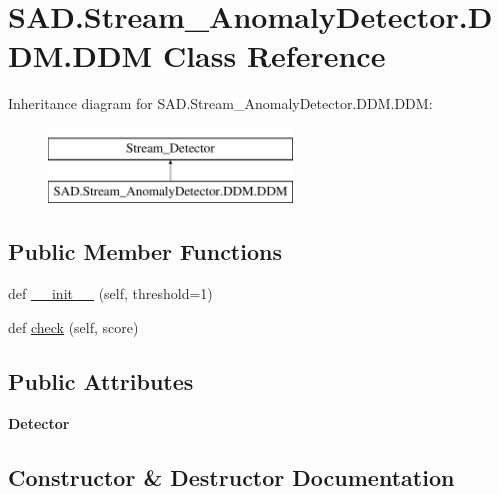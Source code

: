 \hypertarget{classSAD_1_1Stream__AnomalyDetector_1_1DDM_1_1DDM}{}\section{S\+A\+D.\+Stream\+\_\+\+Anomaly\+Detector.\+D\+D\+M.\+D\+DM Class Reference}
\label{classSAD_1_1Stream__AnomalyDetector_1_1DDM_1_1DDM}
Inheritance diagram for S\+A\+D.\+Stream\+\_\+\+Anomaly\+Detector.\+D\+D\+M.\+D\+DM\+:\begin{figure}[H]
\begin{center}
\leavevmode
\includegraphics[height=2.000000cm]{classSAD_1_1Stream__AnomalyDetector_1_1DDM_1_1DDM}
\end{center}
\end{figure}
\subsection*{Public Member Functions}
\begin{DoxyCompactItemize}
\item 
def \hyperlink{classSAD_1_1Stream__AnomalyDetector_1_1DDM_1_1DDM_aeb97cdad81d1c9161855e825ce1fc343}{\+\_\+\+\_\+init\+\_\+\+\_\+} (self, threshold=1)
\item 
def \hyperlink{classSAD_1_1Stream__AnomalyDetector_1_1DDM_1_1DDM_ae2afdf68bb18604f54496559f3d3577a}{check} (self, score)
\end{DoxyCompactItemize}
\subsection*{Public Attributes}
\begin{DoxyCompactItemize}
\item 
{\bfseries Detector}\hypertarget{classSAD_1_1Stream__AnomalyDetector_1_1DDM_1_1DDM_acf042d7d556742c3573344d08539ab95}{}\label{classSAD_1_1Stream__AnomalyDetector_1_1DDM_1_1DDM_acf042d7d556742c3573344d08539ab95}

\end{DoxyCompactItemize}


\subsection{Constructor \& Destructor Documentation}
